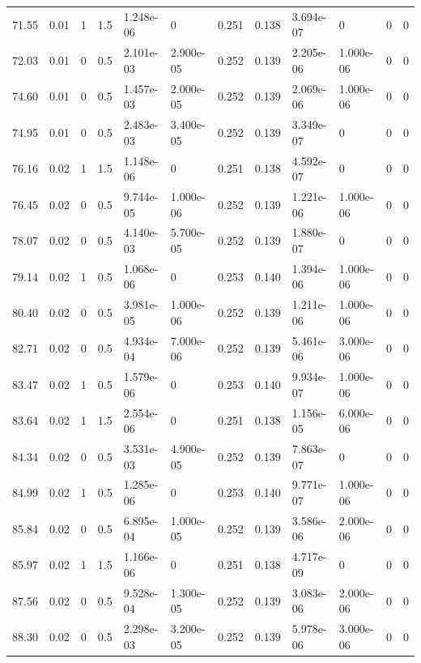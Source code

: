 \documentclass[preview]{standalone}
\begin{document}
{{{\begin{tabular}{L{1.2cm}C{1.2cm} C{0.3cm}C{0.5cm} C{1.4cm}C{1.4cm} C{1.4cm}C{1.4cm} C{1.6cm}C{1.6cm} C{1.6cm}C{1.6cm}}
  71.55  &  0.01  & 1     & 1.5 &  1.248e-06  & 0  &  0.251&   0.138& 3.694e-07 & 0   &  0 & 0  \\ 
  72.03  &  0.01  & 0     & 0.5 &  2.101e-03  & 2.900e-05  &  0.252&   0.139& 2.205e-06 & 1.000e-06   &  0 & 0  \\ 
  74.60  &  0.01  & 0     & 0.5 &  1.457e-03  & 2.000e-05  &  0.252&   0.139& 2.069e-06 & 1.000e-06   &  0 & 0  \\ 
  74.95  &  0.01  & 0     & 0.5 &  2.483e-03  & 3.400e-05  &  0.252&   0.139& 3.349e-07 & 0   &  0 & 0  \\ 
  76.16  &  0.02  & 1     & 1.5 &  1.148e-06  & 0  &  0.251&   0.138& 4.592e-07 & 0   &  0 & 0  \\ 
  76.45  &  0.02  & 0     & 0.5 &  9.744e-05  & 1.000e-06  &  0.252&   0.139& 1.221e-06 & 1.000e-06   &  0 & 0  \\ 
  78.07  &  0.02  & 0     & 0.5 &  4.140e-03  & 5.700e-05  &  0.252&   0.139& 1.880e-07 & 0   &  0 & 0  \\ 
  79.14  &  0.02  & 1     & 0.5 &  1.068e-06  & 0  &  0.253&   0.140& 1.394e-06 & 1.000e-06   &  0 & 0  \\ 
  80.40  &  0.02  & 0     & 0.5 &  3.981e-05  & 1.000e-06  &  0.252&   0.139& 1.211e-06 & 1.000e-06   &  0 & 0  \\ 
  82.71  &  0.02  & 0     & 0.5 &  4.934e-04  & 7.000e-06  &  0.252&   0.139& 5.461e-06 & 3.000e-06   &  0 & 0  \\ 
  83.47  &  0.02  & 1     & 0.5 &  1.579e-06  & 0  &  0.253&   0.140& 9.934e-07 & 1.000e-06   &  0 & 0  \\ 
  83.64  &  0.02  & 1     & 1.5 &  2.554e-06  & 0  &  0.251&   0.138& 1.156e-05 & 6.000e-06   &  0 & 0  \\ 
  84.34  &  0.02  & 0     & 0.5 &  3.531e-03  & 4.900e-05  &  0.252&   0.139& 7.863e-07 & 0   &  0 & 0  \\ 
  84.99  &  0.02  & 1     & 0.5 &  1.285e-06  & 0  &  0.253&   0.140& 9.771e-07 & 1.000e-06   &  0 & 0  \\ 
  85.84  &  0.02  & 0     & 0.5 &  6.895e-04  & 1.000e-05  &  0.252&   0.139& 3.586e-06 & 2.000e-06   &  0 & 0  \\ 
  85.97  &  0.02  & 1     & 1.5 &  1.166e-06  & 0  &  0.251&   0.138& 4.717e-09 & 0   &  0 & 0  \\ 
  87.56  &  0.02  & 0     & 0.5 &  9.528e-04  & 1.300e-05  &  0.252&   0.139& 3.083e-06 & 2.000e-06   &  0 & 0  \\ 
  88.30  &  0.02  & 0     & 0.5 &  2.298e-03  & 3.200e-05  &  0.252&   0.139& 5.978e-06 & 3.000e-06   &  0 & 0  \\ 

\end{tabular}}}}
\end{document}
